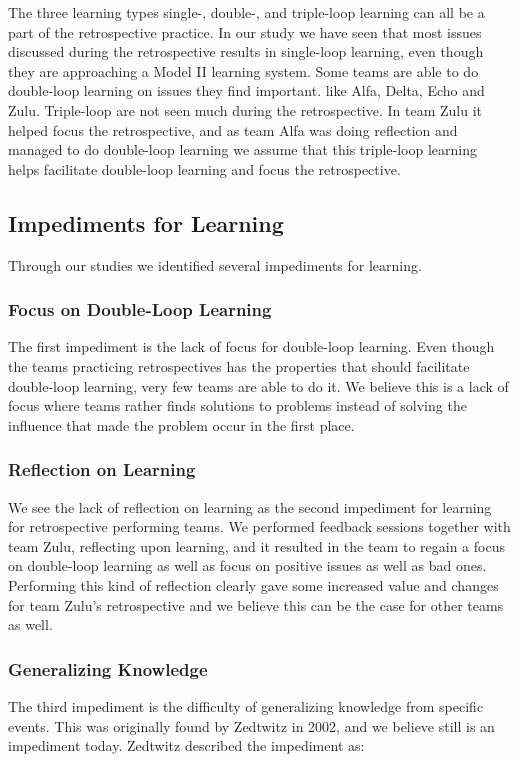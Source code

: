 The three learning types single-, double-, and triple-loop learning can all be a part of the retrospective practice. In our study we have seen that most issues discussed during the retrospective results in single-loop learning, even though they are approaching a Model II learning system. Some teams are able to do double-loop learning on issues they find important. like Alfa, Delta, Echo and Zulu. Triple-loop are not seen much during the retrospective. In team Zulu it helped focus the retrospective, and as team Alfa was doing reflection and managed to do double-loop learning we assume that this triple-loop learning helps facilitate double-loop learning and focus the retrospective. 

\subsection{Impediments for Learning}
\label{discussion:learning-impediments}
Through our studies we identified several impediments for learning. 

\subsubsection{Focus on Double-Loop Learning}
The first impediment is the lack of focus for double-loop learning. Even though the teams practicing retrospectives has the properties that should facilitate double-loop learning, very few teams are able to do it. We believe this is a lack of focus where teams rather finds solutions to problems instead of solving the influence that made the problem occur in the first place.

\subsubsection{Reflection on Learning}
We see the lack of reflection on learning as the second impediment for learning for retrospective performing teams. We performed feedback sessions together with team Zulu, reflecting upon learning, and it resulted in the team to regain a focus on double-loop learning as well as focus on positive issues as well as bad ones. Performing this kind of reflection clearly gave some increased value and changes for team Zulu's retrospective and we believe this can be the case for other teams as well. 

\subsubsection{Generalizing Knowledge}
The third impediment is the difficulty of generalizing knowledge from specific events. This was originally found by Zedtwitz \cite{Zedtwitz2002} in 2002, and we believe still is an impediment today. Zedtwitz described the impediment as: 

